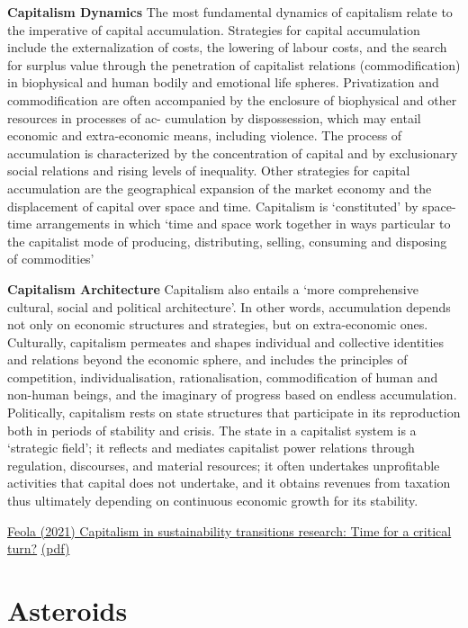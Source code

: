 \documentclass[
]{book}
\begin{document}
\textbf{Capitalism Dynamics}
The most fundamental dynamics of capitalism relate to the imperative of capital accumulation.
Strategies for
capital accumulation include the externalization of costs, the lowering of labour costs, and the search for surplus value through the
penetration of capitalist relations (commodification) in biophysical and human bodily and emotional life spheres.
Privatization and commodification are often accompanied by the enclosure of biophysical and other resources in processes of ac-
cumulation by dispossession, which may entail economic and extra-economic means, including violence. The
process of accumulation is characterized by the concentration of capital and by exclusionary social relations and rising levels of
inequality. Other strategies for capital accumulation are the geographical expansion of the market
economy and the displacement of capital over space and time. Capitalism is `constituted' by space-time arrangements
in which `time and space work together in ways particular to the capitalist mode of producing, distributing, selling, consuming and
disposing of commodities'

\textbf{Capitalism Architecture}
Capitalism also entails a `more comprehensive cultural, social and political architecture'.
In other words, accumulation depends not only on economic structures and strategies, but on extra-economic ones.
Culturally, capitalism permeates and shapes individual and collective identities and relations beyond the economic sphere, and
includes the principles of competition, individualisation, rationalisation, commodification of human and non-human beings, and the
imaginary of progress based on endless accumulation. Politically,
capitalism rests on state structures that participate in its reproduction both in periods of stability and crisis. The state in a capitalist
system is a `strategic field'; it reflects and mediates capitalist power relations through
regulation, discourses, and material resources; it often undertakes unprofitable activities that capital does not undertake, and it
obtains revenues from taxation thus ultimately depending on continuous economic growth for its stability.

\href{https://www.sciencedirect.com/science/article/pii/S2210422418301576}{Feola (2021) Capitalism in sustainability transitions research: Time for a critical turn?}
\href{pdf/Feola_2021_Capitalism_in_Sustainable_Transitions_Research.pdf}{(pdf)}

\hypertarget{asteroids}{%
\chapter{Asteroids}\label{asteroids}}
\end{document}

